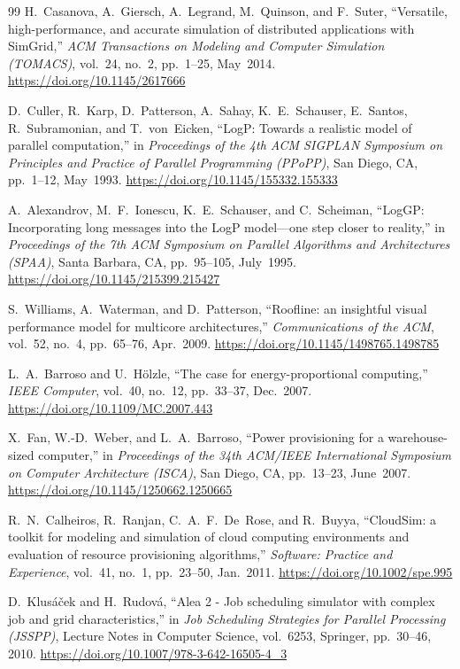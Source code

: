 \documentclass[11pt,a4paper]{article}
\begin{document}
\begin{thebibliography}{99}
H.~Casanova, A.~Giersch, A.~Legrand, M.~Quinson, and F.~Suter,
``Versatile, high-performance, and accurate simulation of distributed applications with SimGrid,''
\textit{ACM Transactions on Modeling and Computer Simulation (TOMACS)}, vol.~24, no.~2, pp.~1--25, May~2014.
\url{https://doi.org/10.1145/2617666}

D.~Culler, R.~Karp, D.~Patterson, A.~Sahay, K.~E.~Schauser, E.~Santos, R.~Subramonian, and T.~von~Eicken,
``LogP: Towards a realistic model of parallel computation,''
in \textit{Proceedings of the 4th ACM SIGPLAN Symposium on Principles and Practice of Parallel Programming (PPoPP)}, San Diego, CA, pp.~1--12, May~1993.
\url{https://doi.org/10.1145/155332.155333}

A.~Alexandrov, M.~F.~Ionescu, K.~E.~Schauser, and C.~Scheiman,
``LogGP: Incorporating long messages into the LogP model---one step closer to reality,''
in \textit{Proceedings of the 7th ACM Symposium on Parallel Algorithms and Architectures (SPAA)}, Santa Barbara, CA, pp.~95--105, July~1995.
\url{https://doi.org/10.1145/215399.215427}

S.~Williams, A.~Waterman, and D.~Patterson,
``Roofline: an insightful visual performance model for multicore architectures,''
\textit{Communications of the ACM}, vol.~52, no.~4, pp.~65--76, Apr.~2009.
\url{https://doi.org/10.1145/1498765.1498785}

L.~A.~Barroso and U.~H{\"o}lzle,
``The case for energy-proportional computing,''
\textit{IEEE Computer}, vol.~40, no.~12, pp.~33--37, Dec.~2007.
\url{https://doi.org/10.1109/MC.2007.443}

X.~Fan, W.-D.~Weber, and L.~A.~Barroso,
``Power provisioning for a warehouse-sized computer,''
in \textit{Proceedings of the 34th ACM/IEEE International Symposium on Computer Architecture (ISCA)}, San Diego, CA, pp.~13--23, June~2007.
\url{https://doi.org/10.1145/1250662.1250665}

R.~N.~Calheiros, R.~Ranjan, C.~A.~F.~De~Rose, and R.~Buyya,
``CloudSim: a toolkit for modeling and simulation of cloud computing environments and evaluation of resource provisioning algorithms,''
\textit{Software: Practice and Experience}, vol.~41, no.~1, pp.~23--50, Jan.~2011.
\url{https://doi.org/10.1002/spe.995}

D.~Klus{\'a}{\v{c}}ek and H.~Rudov{\'a},
``Alea 2 - Job scheduling simulator with complex job and grid characteristics,''
in \textit{Job Scheduling Strategies for Parallel Processing (JSSPP)}, Lecture Notes in Computer Science, vol.~6253, Springer, pp.~30--46, 2010.
\url{https://doi.org/10.1007/978-3-642-16505-4_3}


\end{thebibliography}
\end{document}
